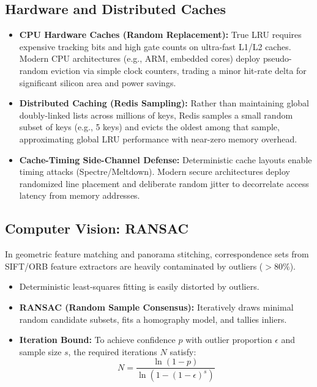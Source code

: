 \documentclass[11pt,a4paper]{article}
\begin{document}
\subsection{Hardware and Distributed Caches}
\begin{itemize}
    \item \textbf{CPU Hardware Caches (Random Replacement):} True LRU requires expensive tracking bits and high gate counts on ultra-fast L1/L2 caches. Modern CPU architectures (e.g., ARM, embedded cores) deploy pseudo-random eviction via simple clock counters, trading a minor hit-rate delta for significant silicon area and power savings.
    \item \textbf{Distributed Caching (Redis Sampling):} Rather than maintaining global doubly-linked lists across millions of keys, Redis samples a small random subset of keys (e.g., 5 keys) and evicts the oldest among that sample, approximating global LRU performance with near-zero memory overhead.
    \item \textbf{Cache-Timing Side-Channel Defense:} Deterministic cache layouts enable timing attacks (Spectre/Meltdown). Modern secure architectures deploy randomized line placement and deliberate random jitter to decorrelate access latency from memory addresses.
\end{itemize}

\subsection{Computer Vision: RANSAC}
In geometric feature matching and panorama stitching, correspondence sets from SIFT/ORB feature extractors are heavily contaminated by outliers ($>80\%$).
\begin{itemize}
    \item Deterministic least-squares fitting is easily distorted by outliers.
    \item \textbf{RANSAC (Random Sample Consensus):} Iteratively draws minimal random candidate subsets, fits a homography model, and tallies inliers.
    \item \textbf{Iteration Bound:} To achieve confidence $p$ with outlier proportion $\epsilon$ and sample size $s$, the required iterations $N$ satisfy:
    \begin{equation}
    N = \frac{\ln(1 - p)}{\ln(1 - (1 - \epsilon)^s)}
    \end{equation}
\end{itemize}
\end{document}
